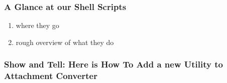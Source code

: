 \documentclass[11pt]{article}
\begin{document}
\subsubsection{A Glance at our Shell Scripts}
\label{sec:org6a09af2}

\begin{enumerate}
\item where they go
\label{sec:org7a86fad}

\item rough overview of what they do
\label{sec:org127ffb1}
\end{enumerate}

\subsubsection{Show and Tell: Here is How To Add a new Utility to Attachment Converter}
\label{sec:orgcdf8a6e}
\end{document}
